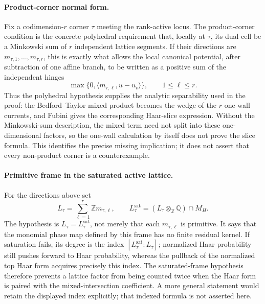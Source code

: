 \documentclass[10pt,a4paper]{amsart}
\theoremstyle{plain}
\theoremstyle{plain}
\numberwithin{equation}{section}
\begin{document}
\paragraph{Product-corner normal form.}
Fix a codimension-\(r\) corner \(\tau\) meeting the rank-active locus.  The
product-corner condition is the concrete polyhedral requirement that, locally
at \(\tau\), its dual cell be a Minkowski sum of \(r\) independent lattice
segments.  If their directions are
\(m_{\tau,1},\ldots,m_{\tau,r}\), this is exactly what allows the local
canonical potential, after subtraction of one affine branch, to be written as
a positive sum of the independent hinges
\[
\max\{0,\langle m_{\tau,\ell},u-u_v\rangle\},
\qquad 1\leq \ell\leq r.
\]
Thus the polyhedral hypothesis supplies the analytic separability used in the
proof: the Bedford--Taylor mixed product becomes the wedge of the \(r\)
one-wall currents, and Fubini gives the corresponding Haar-slice expression.
Without the Minkowski-sum description, the mixed term need not split into
these one-dimensional factors, so the one-wall calculation by itself does not
prove the slice formula.  This identifies the precise missing implication; it
does not assert that every non-product corner is a counterexample.

\paragraph{Primitive frame in the saturated active lattice.}
For the directions above set
\[
L_\tau=\sum_{\ell=1}^r\mathbb Zm_{\tau,\ell},\qquad
L_\tau^{\mathrm{sat}}
=(L_\tau\otimes_{\mathbb Z}\mathbb Q)\cap M_H.
\]
The hypothesis is \(L_\tau=L_\tau^{\mathrm{sat}}\), not merely that each
\(m_{\tau,\ell}\) is primitive.  It says that the monomial phase map defined
by this frame has no finite residual kernel.  If saturation fails, its degree
is the index \([L_\tau^{\mathrm{sat}}:L_\tau]\); normalized Haar probability
still pushes forward to Haar probability, whereas the pullback of the
normalized top Haar form acquires precisely this index.  The saturated-frame
hypothesis therefore prevents a lattice factor from being counted twice when
the Haar form is paired with the mixed-intersection coefficient.  A more
general statement would retain the displayed index explicitly; that indexed
formula is not asserted here.
\end{document}
